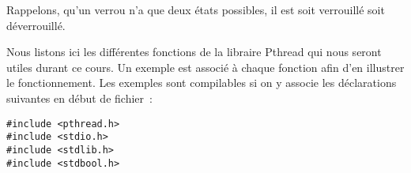 \hspace{1cm}

\hspace{7cm}

Rappelons, qu'un verrou n'a que deux états possibles, il est soit verrouillé soit déverrouillé.

Nous listons ici les différentes fonctions de la libraire Pthread qui nous seront utiles durant ce cours. Un exemple est associé à chaque fonction afin d'en illustrer le fonctionnement. Les exemples sont compilables si on y associe les déclarations suivantes en début de fichier~:

\begin{lstlisting}
#include <pthread.h>
#include <stdio.h>
#include <stdlib.h>
#include <stdbool.h>
\end{lstlisting}

